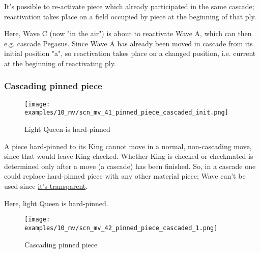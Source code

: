 \vspace*{-0.3\baselineskip}
It's possible to re-activate piece which already participated in the same cascade;
reactivation takes place on a field occupied by piece at the beginning of that ply.

Here, Wave C (now "in the air") is about to reactivate Wave A, which can then e.g.
cascade Pegasus. Since Wave A has already been moved in cascade from its initial
position "a", so reactivation takes place on a changed position, i.e. current at
the beginning of reactivating ply.

\clearpage %

\subsubsection*{Cascading pinned piece}
\label{sec:Miranda's veil/Wave/Cascading Waves/Cascading pinned piece}

\vspace*{-1.5\baselineskip}
\noindent
\begin{figure}[!h]
\texttt{[image: examples/10\_mv/scn\_mv\_41\_pinned\_piece\_cascaded\_init.png]}
\vspace*{-1.3\baselineskip}
\caption{Light Queen is hard-pinned}
\label{fig:scn_mv_41_pinned_piece_cascaded_init}
\end{figure}

\vspace*{-0.5\baselineskip}
A piece hard-pinned to its King cannot move in a normal, non-cascading move, since
that would leave King checked. Whether King is checked or checkmated is determined
only after a move (a cascade) has been finished. So, in a cascade one could replace
hard-pinned piece with any other material piece; Wave can't be used since
\hyperref[fig:scn_mv_07_wave_is_transparent]{it's transparent}.

Here, light Queen is hard-pinned.

\clearpage %

\vspace*{-2.1\baselineskip}
\noindent
\begin{figure}[!h]
\texttt{[image: examples/10\_mv/scn\_mv\_42\_pinned\_piece\_cascaded\_1.png]}
\vspace*{-1.3\baselineskip}
\caption{Cascading pinned piece}
\label{fig:scn_mv_42_pinned_piece_cascaded_1}
\end{figure}

